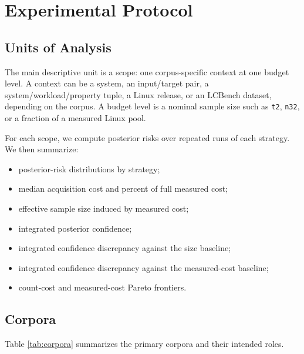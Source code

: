 \documentclass[smallcondensed]{svjour3}
\providecommand{\tightlist}{%
  \setlength{\itemsep}{0pt}\setlength{\parskip}{0pt}}
\begin{document}
\section{Experimental Protocol}\label{experimental-protocol}

\subsection{Units of Analysis}\label{units-of-analysis}

The main descriptive unit is a scope: one corpus-specific context at one
budget level. A context can be a system, an input/target pair, a
system/workload/property tuple, a Linux release, or an LCBench dataset,
depending on the corpus. A budget level is a nominal sample size such as
\texttt{t2}, \texttt{n32}, or a fraction of a measured Linux pool.

For each scope, we compute posterior risks over repeated runs of each
strategy. We then summarize:

\begin{itemize}
\tightlist
\item
  posterior-risk distributions by strategy;
\item
  median acquisition cost and percent of full measured cost;
\item
  effective sample size induced by measured cost;
\item
  integrated posterior confidence;
\item
  integrated confidence discrepancy against the size baseline;
\item
  integrated confidence discrepancy against the measured-cost baseline;
\item
  count-cost and measured-cost Pareto frontiers.
\end{itemize}

\subsection{Corpora}\label{corpora}

Table \ref{tab:corpora} summarizes the primary corpora and their
intended roles.
\end{document}
